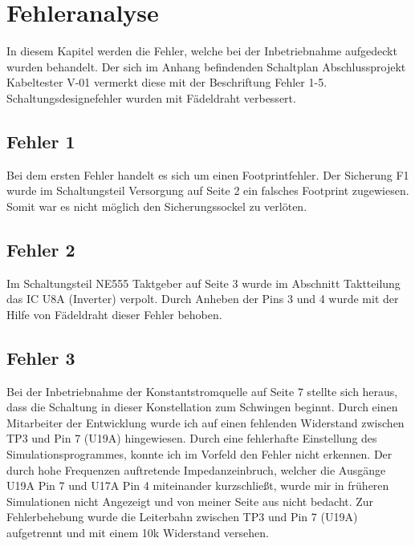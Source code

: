 \section{Fehleranalyse}


In diesem Kapitel werden die Fehler, welche bei der Inbetriebnahme aufgedeckt wurden behandelt. Der sich im Anhang befindenden Schaltplan \glqq Abschlussprojekt Kabeltester  V-01\grqq{} vermerkt diese mit der Beschriftung \glqq Fehler 1-5\grqq{}. Schaltungsdesignefehler wurden mit Fädeldraht verbessert.  




\subsection{Fehler 1}

Bei dem ersten Fehler handelt es sich um einen Footprintfehler. Der Sicherung F1 wurde im Schaltungsteil \glqq Versorgung \grqq{} auf Seite 2 ein falsches Footprint zugewiesen. Somit war es nicht möglich den Sicherungssockel zu verlöten. 


\subsection{Fehler 2}

Im Schaltungsteil \glqq NE555 Taktgeber\grqq{} auf Seite 3 wurde im Abschnitt \glqq Taktteilung\grqq{} das IC U8A (Inverter) verpolt. Durch Anheben der Pins 3 und 4 wurde mit der Hilfe von Fädeldraht dieser Fehler behoben.



\subsection{Fehler 3}

Bei der Inbetriebnahme der Konstantstromquelle auf Seite 7 stellte sich heraus, dass die Schaltung in dieser Konstellation zum Schwingen beginnt. Durch einen Mitarbeiter der Entwicklung wurde ich auf einen fehlenden Widerstand zwischen TP3 und Pin 7 (U19A) hingewiesen. Durch eine fehlerhafte Einstellung des Simulationsprogrammes, konnte ich im Vorfeld den Fehler nicht erkennen. Der durch hohe Frequenzen auftretende Impedanzeinbruch, welcher die Ausgänge U19A Pin 7 und U17A Pin 4 miteinander kurzschließt, wurde mir in früheren Simulationen nicht Angezeigt und von meiner Seite aus nicht bedacht. Zur Fehlerbehebung wurde die Leiterbahn zwischen TP3 und Pin 7 (U19A) aufgetrennt und mit einem 10k Widerstand versehen. 



